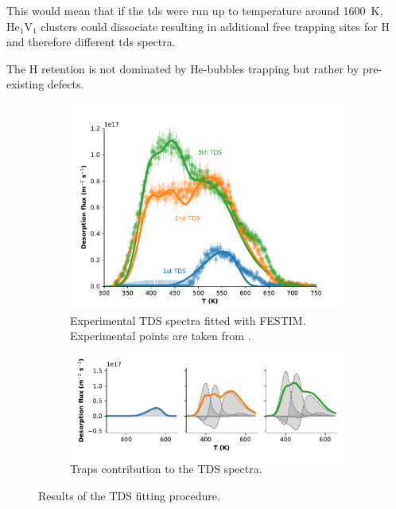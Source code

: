 This would mean that if the \gls{tds} were run up to temperature around \SI{1600}{K}, $\mathrm{He}_1\mathrm{V}_1$ clusters could dissociate resulting in additional free trapping sites for \gls{H} and therefore different \gls{tds} spectra.

The \gls{H} retention is not dominated by \gls{He}-bubbles trapping but rather by pre-existing defects.

\begin{figure}[h!]
    \centering
    \begin{subfigure}{\linewidth}
        \includegraphics[width=\linewidth]{Figures/Chapter5/ialovega_tds.pdf}
        \caption{Experimental TDS spectra fitted with FESTIM. Experimental points are taken from \cite{ialovega_hydrogen_2020}.}
    \end{subfigure}
    \begin{subfigure}{\linewidth}
        \includegraphics[width=\linewidth]{Figures/Chapter5/tds_trap_distribution.pdf}
        \caption{Traps contribution to the TDS spectra.}
    \end{subfigure}
    \caption{Results of the TDS fitting procedure.}
\end{figure}

